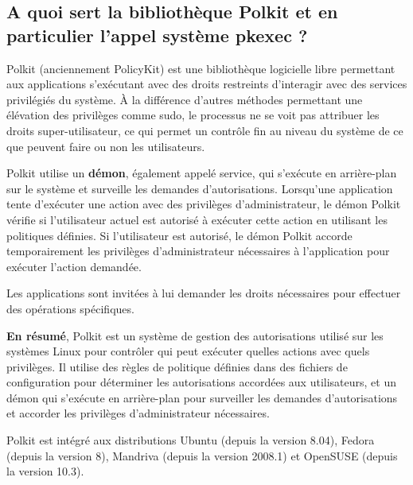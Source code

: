 \documentclass[12pt,a4paper]{article}
\begin{document}
\begin{flushleft}
            \subsection{A quoi sert la bibliothèque Polkit et en particulier l'appel système pkexec ? }
            \begin{flushleft}
                \noindent Polkit (anciennement PolicyKit) est une bibliothèque logicielle libre permettant aux applications s'exécutant avec des droits restreints d'interagir avec des services privilégiés du système. À la différence d'autres méthodes permettant une élévation des privilèges comme sudo, le processus ne se voit pas attribuer les droits super-utilisateur, ce qui permet un contrôle fin au niveau du système de ce que peuvent faire ou non les utilisateurs. \cite{policyki47:online}
                \item Polkit utilise un \textbf{démon}, également appelé service, qui s'exécute en arrière-plan sur le système et surveille les demandes d'autorisations. Lorsqu'une application tente d'exécuter une action avec des privilèges d'administrateur, le démon Polkit vérifie si l'utilisateur actuel est autorisé à exécuter cette action en utilisant les politiques définies. Si l'utilisateur est autorisé, le démon Polkit accorde temporairement les privilèges d'administrateur nécessaires à l'application pour exécuter l'action demandée.
                \item Les applications sont invitées à lui demander les droits nécessaires pour effectuer des opérations spécifiques.
                \item \textbf{En résumé}, Polkit est un système de gestion des autorisations utilisé sur les systèmes Linux pour contrôler qui peut exécuter quelles actions avec quels privilèges. Il utilise des règles de politique définies dans des fichiers de configuration pour déterminer les autorisations accordées aux utilisateurs, et un démon qui s'exécute en arrière-plan pour surveiller les demandes d'autorisations et accorder les privilèges d'administrateur nécessaires.
                \item Polkit est intégré aux distributions Ubuntu (depuis la version 8.04), Fedora (depuis la version 8), Mandriva (depuis la version 2008.1) et OpenSUSE (depuis la version 10.3).

\end{flushleft}
\end{flushleft}
\end{document}

